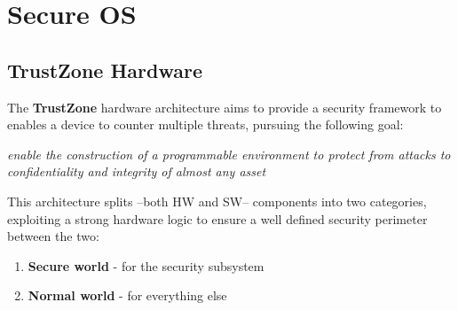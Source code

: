 \chapter{Secure OS}

\section{TrustZone Hardware}

The \textbf{TrustZone} hardware architecture aims to provide a security framework
to enables a device to counter multiple threats, pursuing the following goal:
\begin{center}
   \textit{enable the construction of a programmable environment to protect
   from attacks to confidentiality and integrity of almost any asset}
\end{center}

This architecture splits {--}both HW and SW{--} components into two categories, exploiting a strong hardware logic to ensure a well defined security perimeter between the two:
\begin{enumerate}
   \item \textbf{Secure world} - for the security subsystem
   \item \textbf{Normal world} - for everything else
\end{enumerate}

